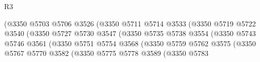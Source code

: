 \begin{lexlean}{R3}
\begin{coremodule}
                                              (@3350
                                                @5703
                                                @5706
                                                @3526
                                                (@3350
                                                  @5711
                                                  @5714
                                                  @3533
                                                  (@3350
                                                    @5719
                                                    @5722
                                                    @3540
                                                    (@3350
                                                      @5727
                                                      @5730
                                                      @3547
                                                      (@3350
                                                        @5735
                                                        @5738
                                                        @3554
                                                        (@3350
                                                          @5743
                                                          @5746
                                                          @3561
                                                          (@3350
                                                            @5751
                                                            @5754
                                                            @3568
                                                            (@3350
                                                              @5759
                                                              @5762
                                                              @3575
                                                              (@3350
                                                                @5767
                                                                @5770
                                                                @3582
                                                                (@3350
                                                                  @5775
                                                                  @5778
                                                                  @3589
                                                                  (@3350
                                                                    @5783

\end{coremodule}
\end{lexlean}

